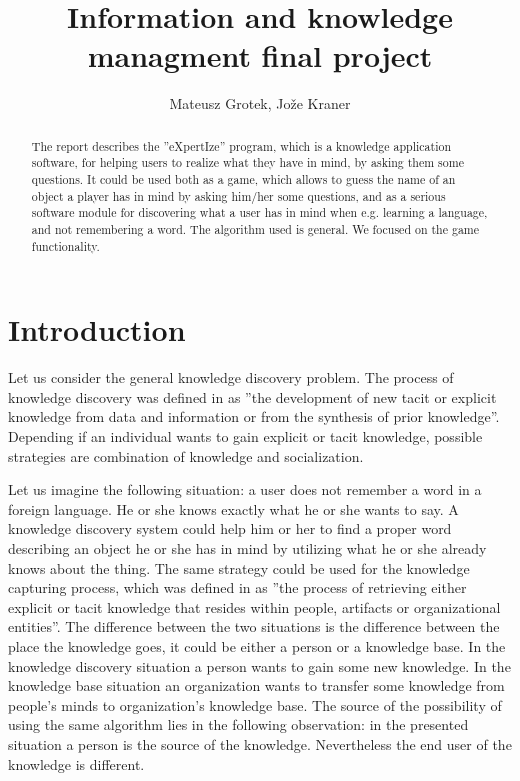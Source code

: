 \documentclass[a4paper]{article}
\title{Information and knowledge managment final project }
\author{Mateusz Grotek, Jože Kraner}
\date{}
\begin{document}
\maketitle
\begin{abstract}
The report describes the ''eXpertIze'' program, which is a knowledge application software, for helping users to realize what they have in mind, by asking them some questions. It could be used both as a game, which allows to guess the name of an object a player has in mind by asking him/her some questions, and as a serious software module for discovering what a user has in mind when e.g. learning a language, and not remembering a word. The algorithm used is general. We focused on the game functionality.
\end{abstract}
\tableofcontents
\section{Introduction}
Let us consider the general knowledge discovery problem. The process of knowledge discovery was defined in \citet{Memon} as ''the development of new tacit or explicit knowledge from data and information or from the synthesis of prior knowledge''. Depending if an individual wants to gain explicit or tacit knowledge, possible strategies are combination of knowledge and socialization. 

Let us imagine the following situation: a user does not remember a word in a foreign language. He or she knows exactly what he or she wants to say. A knowledge discovery system could help him or her to find a proper word describing an object he or she has in mind by utilizing what he or she already knows about the thing. The same strategy could be used for the knowledge capturing process, which was defined in \citet{Memon} as ''the process of retrieving either explicit or tacit knowledge that resides within people, artifacts or organizational entities''. The difference between the two situations is the difference between the place the knowledge goes, it could be either a person or a knowledge base. In the knowledge discovery situation a person wants to gain some new knowledge. In the knowledge base situation an organization wants to transfer some knowledge from people's minds to organization's knowledge base. The source of the possibility of using the same algorithm lies in the following observation: in the presented situation a person is the source of the knowledge. Nevertheless the end user of the knowledge is different.
\end{document}
